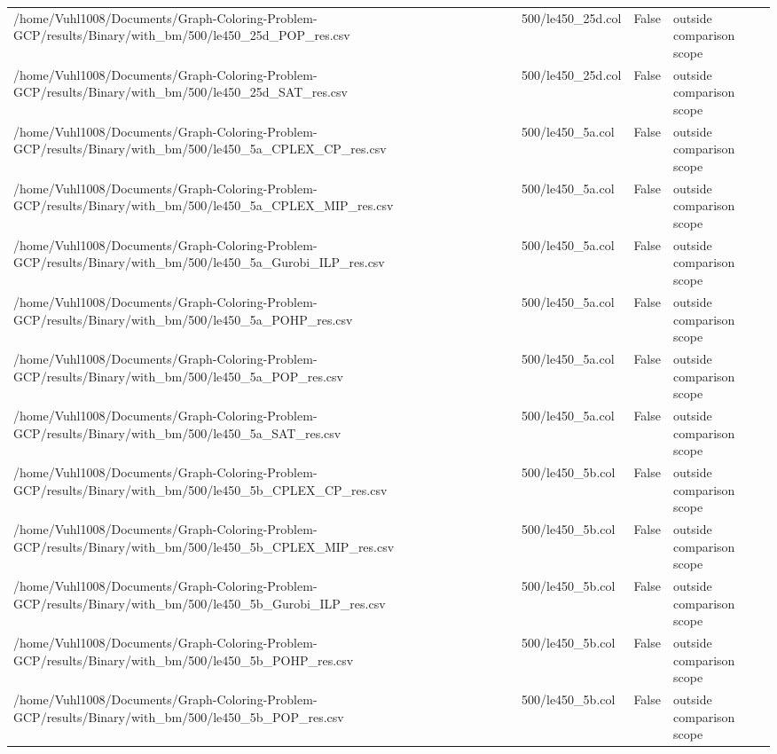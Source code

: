 \begin{table}[htbp]
\begin{tabular}{llll}
/home/Vuhl1008/Documents/Graph-Coloring-Problem-GCP/results/Binary/with\_bm/500/le450\_25d\_POP\_res.csv & 500/le450\_25d.col & False & outside comparison scope \\
/home/Vuhl1008/Documents/Graph-Coloring-Problem-GCP/results/Binary/with\_bm/500/le450\_25d\_SAT\_res.csv & 500/le450\_25d.col & False & outside comparison scope \\
/home/Vuhl1008/Documents/Graph-Coloring-Problem-GCP/results/Binary/with\_bm/500/le450\_5a\_CPLEX\_CP\_res.csv & 500/le450\_5a.col & False & outside comparison scope \\
/home/Vuhl1008/Documents/Graph-Coloring-Problem-GCP/results/Binary/with\_bm/500/le450\_5a\_CPLEX\_MIP\_res.csv & 500/le450\_5a.col & False & outside comparison scope \\
/home/Vuhl1008/Documents/Graph-Coloring-Problem-GCP/results/Binary/with\_bm/500/le450\_5a\_Gurobi\_ILP\_res.csv & 500/le450\_5a.col & False & outside comparison scope \\
/home/Vuhl1008/Documents/Graph-Coloring-Problem-GCP/results/Binary/with\_bm/500/le450\_5a\_POHP\_res.csv & 500/le450\_5a.col & False & outside comparison scope \\
/home/Vuhl1008/Documents/Graph-Coloring-Problem-GCP/results/Binary/with\_bm/500/le450\_5a\_POP\_res.csv & 500/le450\_5a.col & False & outside comparison scope \\
/home/Vuhl1008/Documents/Graph-Coloring-Problem-GCP/results/Binary/with\_bm/500/le450\_5a\_SAT\_res.csv & 500/le450\_5a.col & False & outside comparison scope \\
/home/Vuhl1008/Documents/Graph-Coloring-Problem-GCP/results/Binary/with\_bm/500/le450\_5b\_CPLEX\_CP\_res.csv & 500/le450\_5b.col & False & outside comparison scope \\
/home/Vuhl1008/Documents/Graph-Coloring-Problem-GCP/results/Binary/with\_bm/500/le450\_5b\_CPLEX\_MIP\_res.csv & 500/le450\_5b.col & False & outside comparison scope \\
/home/Vuhl1008/Documents/Graph-Coloring-Problem-GCP/results/Binary/with\_bm/500/le450\_5b\_Gurobi\_ILP\_res.csv & 500/le450\_5b.col & False & outside comparison scope \\
/home/Vuhl1008/Documents/Graph-Coloring-Problem-GCP/results/Binary/with\_bm/500/le450\_5b\_POHP\_res.csv & 500/le450\_5b.col & False & outside comparison scope \\
/home/Vuhl1008/Documents/Graph-Coloring-Problem-GCP/results/Binary/with\_bm/500/le450\_5b\_POP\_res.csv & 500/le450\_5b.col & False & outside comparison scope \\

\end{tabular}
\end{table}
